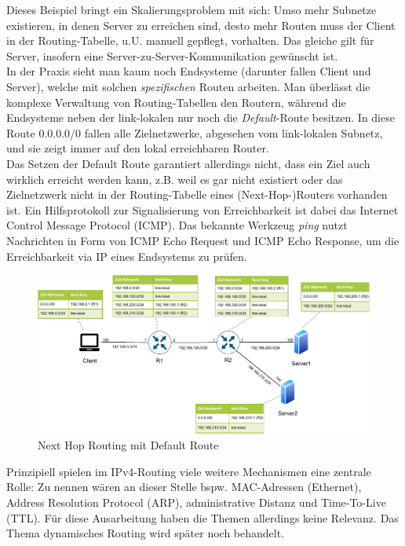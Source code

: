 Dieses Beispiel bringt ein Skalierungsproblem mit sich: Umso mehr Subnetze existieren, in denen Server zu erreichen sind, desto mehr Routen muss der Client in der Routing-Tabelle, u.U. manuell gepflegt, vorhalten. Das gleiche gilt für Server, insofern eine Server-zu-Server-Kommunikation gewünscht ist.\\
In der Praxis sieht man kaum noch Endsysteme (darunter fallen Client und Server), welche mit solchen \textit{spezifischen} Routen arbeiten. Man überlässt die komplexe Verwaltung von Routing-Tabellen den Routern, während die Endsysteme neben der link-lokalen nur noch die \textit{Default}-Route besitzen. In diese Route 0.0.0.0/0 fallen alle Zielnetzwerke, abgesehen vom link-lokalen Subnetz, und sie zeigt immer auf den lokal erreichbaren Router.\\
Das Setzen der Default Route garantiert allerdings nicht, dass ein Ziel auch wirklich erreicht werden kann, z.B. weil es gar nicht existiert oder das Zielnetzwerk nicht in der Routing-Tabelle eines (Next-Hop-)Routers vorhanden ist. Ein Hilfsprotokoll zur Signalisierung von Erreichbarkeit ist dabei das Internet Control Message Protocol (ICMP). Das bekannte Werkzeug \textit{ping} nutzt Nachrichten in Form von ICMP Echo Request und ICMP Echo Response, um die Erreichbarkeit via IP eines Endsystems zu prüfen.
\begin{figure}[h]
  \centering
  \includegraphics{Figures/next_hop_routing_default_route.pdf}
  \caption{Next Hop Routing mit Default Route}
  \label{grafik: next_hop_routing_with_default_route}
\end{figure}\FloatBarrier

Prinzipiell spielen im IPv4-Routing viele weitere Mechanismen eine zentrale Rolle: Zu nennen wären an dieser Stelle bspw. MAC-Adressen (Ethernet), Address Resolution Protocol (ARP), administrative Distanz und Time-To-Live (TTL). Für diese Ausarbeitung haben die Themen allerdings keine Relevanz. Das Thema \glqq dynamisches Routing\grqq{} wird später noch behandelt.

